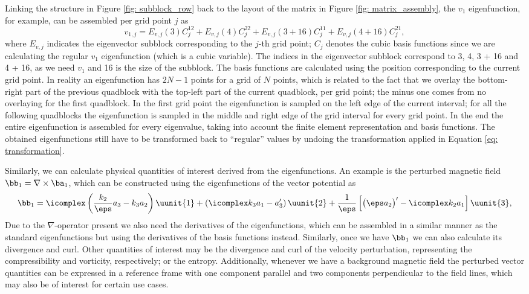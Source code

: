 Linking the structure in Figure \ref{fig: subblock_row} back to the layout of the matrix in Figure \ref{fig: matrix_assembly}, the $v_1$ eigenfunction, for example, can be assembled per grid point $j$ as
\begin{equation}
  v_{1, j} = E_{v, j}(3)C_j^{12} + E_{v, j}(4)C_j^{22} + E_{v, j}(3 + 16)C_j^{11} + E_{v, j}(4 + 16)C_j^{21},
\end{equation}
where $E_{v, j}$ indicates the eigenvector subblock corresponding to the $j$-th grid point; $C_j$ denotes the cubic basis functions since we are calculating the regular $v_1$ eigenfunction (which is a cubic variable). The indices in the eigenvector subblock correspond to 3, 4, 3 + 16 and 4 + 16, as we need $v_1$ and 16 is the size of the subblock. The basis functions are calculated using the position corresponding to the current grid point. In reality an eigenfunction has $2N - 1$ points for a grid of $N$ points, which is related to the fact that we overlay the bottom-right part of the previous quadblock with the top-left part of the current quadblock, per grid point; the minus one comes from no overlaying for the first quadblock. In the first grid point the eigenfunction is sampled on the left edge of the current interval; for all the following quadblocks the eigenfunction is sampled in the middle and right edge of the grid interval for every grid point. In the end the entire eigenfunction is assembled for every eigenvalue, taking into account the finite element representation and basis functions. The obtained eigenfunctions still have to be transformed back to ``regular'' values by undoing the transformation applied in Equation \eqref{eq: transformation}.

Similarly, we can calculate physical quantities of interest derived from the eigenfunctions. An example is the perturbed magnetic field $\bb_1 = \nabla \times \ba_1$, which can be constructed using the eigenfunctions of the vector potential as
\begin{equation}
  \bb_1 =
    \icomplex \left(\frac{k_2}{\eps}a_3 - k_3 a_2\right)\uunit{1}
    + \left(\icomplex k_3 a_1 - a_3'\right)\uunit{2}
    + \frac{1}{\eps}\left[\bigl(\eps a_2\bigr)' - \icomplex k_2 a_1 \right]\uunit{3},
\end{equation}
Due to the $\nabla$-operator present we also need the derivatives of the eigenfunctions, which can be assembled in a similar manner as the standard eigenfunctions but using the derivatives of the basis functions instead. Similarly, once we have $\bb_1$ we can also calculate its divergence and curl. Other quantities of interest may be the divergence and curl of the velocity perturbation, representing the compressibility and vorticity, respectively; or the entropy. Additionally, whenever we have a background magnetic field the perturbed vector quantities can be expressed in a reference frame with one component parallel and two components perpendicular to the field lines, which may also be of interest for certain use cases.

